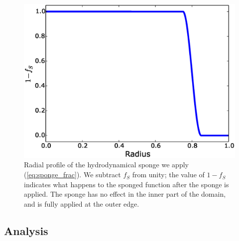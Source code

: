 \documentclass[iop,numberedappendix]{../emulateapj}
\begin{document}
\begin{figure}
  \centering
  \includegraphics[scale=0.4]{plots/sponge}
  \caption{Radial profile of the hydrodynamical sponge we apply (\autoref{eq:sponge_frac}). 
           We subtract $f_S$ from unity; the value of $1 - f_S$ indicates what happens 
           to the sponged function after the sponge is applied. The sponge has no effect 
           in the inner part of the domain, and is fully applied at the outer edge.\label{fig:sponge}}
\end{figure}

\subsection{Analysis}
\label{sec:analysis}
\end{document}
